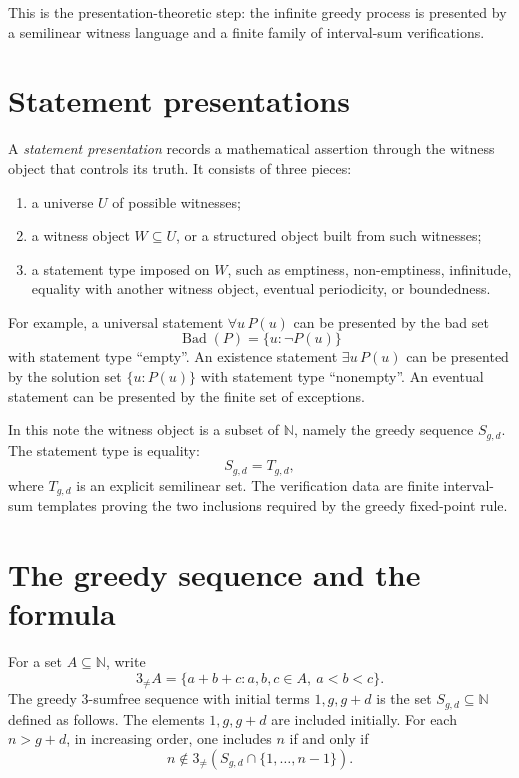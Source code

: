 \documentclass[11pt]{article}
\DeclareMathOperator{\Bad}{Bad}
\begin{document}
This is the presentation-theoretic step: the infinite greedy process is presented by a semilinear witness language and a finite family of interval-sum verifications.

\section{Statement presentations}

A \emph{statement presentation} records a mathematical assertion through the witness object that controls its truth. It consists of three pieces:
\begin{enumerate}[label=\textup{(\roman*)}]
\item a universe \(U\) of possible witnesses;
\item a witness object \(W\subseteq U\), or a structured object built from such witnesses;
\item a statement type imposed on \(W\), such as emptiness, non-emptiness, infinitude, equality with another witness object, eventual periodicity, or boundedness.
\end{enumerate}

For example, a universal statement \(\forall u\,P(u)\) can be presented by the bad set
\[
\Bad(P)=\{u:\neg P(u)\}
\]
with statement type ``empty''. An existence statement \(\exists u\,P(u)\) can be presented by the solution set \(\{u:P(u)\}\) with statement type ``nonempty''. An eventual statement can be presented by the finite set of exceptions.

In this note the witness object is a subset of \(\mathbb N\), namely the greedy sequence \(S_{g,d}\). The statement type is equality:
\[
S_{g,d}=T_{g,d},
\]
where \(T_{g,d}\) is an explicit semilinear set. The verification data are finite interval-sum templates proving the two inclusions required by the greedy fixed-point rule.

\section{The greedy sequence and the formula}

For a set \(A\subseteq\mathbb N\), write
\[
3_{\neq}A=\{a+b+c:a,b,c\in A,\ a<b<c\}.
\]
The greedy 3-sumfree sequence with initial terms \(1,g,g+d\) is the set \(S_{g,d}\subseteq\mathbb N\) defined as follows. The elements \(1,g,g+d\) are included initially. For each \(n>g+d\), in increasing order, one includes \(n\) if and only if
\[
n\notin 3_{\neq}(S_{g,d}\cap\{1,\ldots,n-1\}).
\]
\end{document}
